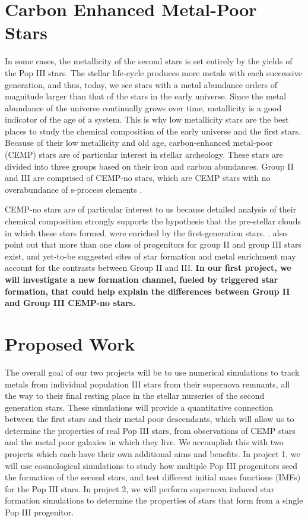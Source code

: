 \documentclass[a4paper, 12pt]{article}
\begin{document}
\section{Carbon Enhanced Metal-Poor Stars}

In some cases, the metallicity of the second stars is set entirely by the yields of the Pop III stars. The stellar life-cycle produces more metals with each successive generation, and thus, today, we see stars with a metal abundance orders of magnitude larger than that of the stars in the early universe. Since the metal abundance of the universe continually grows over time, metallicity is a good indicator of the age of a system. This is why low metallicity stars are the best places to study the chemical composition of the early universe and the first stars. Because of their low metallicity and old age, carbon-enhanced metal-poor (CEMP) stars are of particular interest in stellar archeology. These stars are divided into three groups based on their iron and carbon abundances. Group II and III are comprised of CEMP-no stars, which are CEMP stars with no overabundance of s-process elements \citep{Maeder2015}. 

CEMP-no stars are of particular interest to us because detailed analysis of their chemical composition strongly supports the hypothesis that the pre-stellar clouds in which these stars formed, were enriched by the first-generation stars. \citep{Yoon2016}. \cite{Yoon2016} also point out that more than one class of progenitors for group II and group III stars exist, and yet-to-be suggested sites of star formation and metal enrichment may account for the contrasts between Group II and III. \textbf{In our first project, we will investigate a new formation channel, fueled by triggered star formation, that could help explain the differences between Group II and Group III CEMP-no stars.}


\section{Proposed Work}
The overall goal of our two projects will be to use numerical simulations to track metals from individual population III stars from their supernova remnants, all the way to their final resting place in the stellar nurseries of the second generation stars. These simulations will provide a quantitative connection between the first stars and their metal poor descendants, which will allow us to determine the properties of real Pop III stars, from observations of CEMP stars and the metal poor galaxies in which they live. We accomplish this with two projects which each have their own additional aims and benefits. In project 1, we will use cosmological simulations to study how multiple Pop III progenitors seed the formation of the second stars, and test different initial mass functions (IMFs) for the Pop III stars. In project 2, we will perform supernova induced star formation simulations to determine the properties of stars that form from a single Pop III progenitor.
\end{document}
